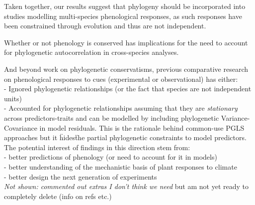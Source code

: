 \documentclass{article}\usepackage[]{graphicx}\usepackage[]{color}
\begin{document}
Taken together, our results suggest that phylogeny should be incorporated into studies modelling multi-species phenological responses, as such responses have been constrained through evolution and thus are not independent.  

Whether or not phenology is conserved has implications for the need to account for phylogenetic autocorrelation in cross-species analyses.

And beyond work on phylogenetic conservatisms, previous comparative research on phenological responses to cues (experimental or observational) has either:\\

- Ignored phylogenetic relationships (or the fact that species are not independent units)\\
- Accounted for phylogenetic relationships assuming that they are \emph{stationary} across predictors-traits and can be modelled by including phylogenetic Variance-Covariance in model residuals. This is the rationale behind common-use PGLS approaches but it \"hides\" the partial phylogenetic constraints to model predictors.\\ 

The potential interest of findings in this direction stem from:\\
- better predictions of phenology (or need to account for it in models)\\
- better understanding of the mechanistic basis of plant responses to climate\\
- better design the next generation of experiments \\

\emph{Not shown: commented out extras I don't think we need} but am not yet ready to completely delete (info on refs etc.)\\
\end{document}
